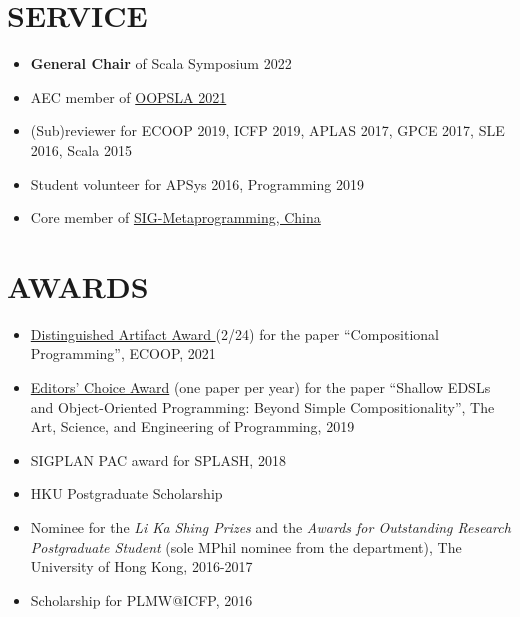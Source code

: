 \documentclass[paper=letter,fontsize=11pt]{scrartcl} %
\newcommand{\NewPart}[2]{\section*{\uppercase{#1} #2}}
\newcommand{\PaperEntry}[4]{
		\noindent #1, ``{#2}", In \textit{#3}, #4.} %
\newcommand{\ArxivEntry}[3]{
		\noindent #1, ``\href{http://arxiv.org/abs/#3}{#2}", \textit{{cond-mat/}#3}.}
\begin{document}
\NewPart{Service}{}
\begin{itemize}
\item \textbf{General Chair} of Scala Symposium 2022
\item AEC member of \href{https://2021.splashcon.org/committee/splash-2021-Artifacts-artifact-evaluation-committee}{OOPSLA 2021}
\item (Sub)reviewer for ECOOP 2019, ICFP 2019, APLAS 2017, GPCE 2017, SLE 2016, Scala 2015
\item Student volunteer for APSys 2016, Programming 2019
\item Core member of \href{https://gitee.com/HW-PLLab/community/tree/master/sigs/SIG-MetaProgramming}{SIG-Metaprogramming, China}
\end{itemize}





\NewPart{Awards}{}
\begin{itemize}
\item \href{https://2021.ecoop.org/attending/ecoop-awards#distinguished-artifact-awards}{Distinguished Artifact Award }(2/24) for the paper ``Compositional Programming'', ECOOP, 2021
\item \href{https://programming-journal.org/awards}{Editors' Choice Award} (one paper per year) for the paper ``Shallow EDSLs and Object-Oriented
  Programming: Beyond Simple Compositionality'', The Art, Science, and Engineering of Programming, 2019
\item SIGPLAN PAC award for SPLASH, 2018
\item HKU Postgraduate Scholarship
\item Nominee for the \emph{Li Ka Shing Prizes} and the \emph{Awards for Outstanding Research
  Postgraduate Student} (sole MPhil nominee from the department), The University of Hong Kong, 2016-2017
\item Scholarship for PLMW@ICFP, 2016
\end{itemize}
\end{document}
